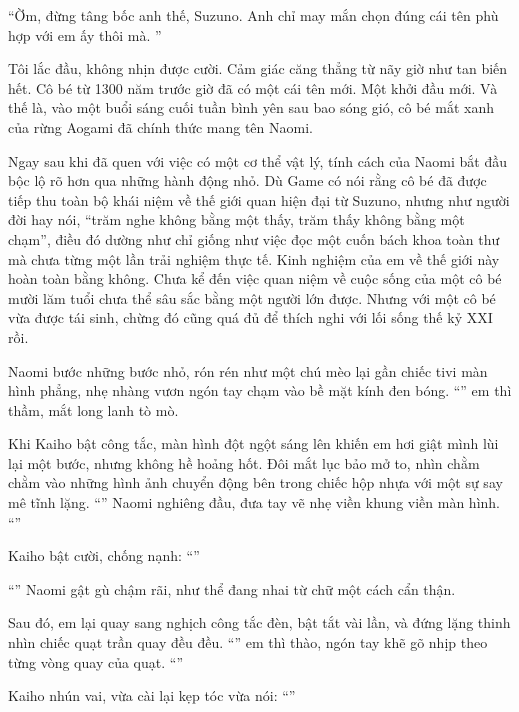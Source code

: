 \documentclass[../main.tex]{subfiles}
\begin{document}
``Ờm, đừng tâng bốc anh thế, Suzuno. Anh chỉ may mắn chọn đúng cái tên phù hợp với em ấy thôi mà. ''

Tôi lắc đầu, không nhịn được cười. Cảm giác căng thẳng từ nãy giờ như tan biến hết. Cô bé từ 1300 năm trước giờ đã có một cái tên mới. Một khởi đầu mới. Và thế là, vào một buổi sáng cuối tuần bình yên sau bao sóng gió, cô bé mắt xanh của rừng Aogami đã chính thức mang tên Naomi.

\ct

Ngay sau khi đã quen với việc có một cơ thể vật lý, tính cách của Naomi bắt đầu bộc lộ rõ hơn qua những hành động nhỏ. Dù Game có nói rằng cô bé đã được tiếp thu toàn bộ khái niệm về thế giới quan hiện đại từ Suzuno, nhưng như người đời hay nói, ``trăm nghe không bằng một thấy, trăm thấy không bằng một chạm'', điều đó dường như chỉ giống như việc đọc một cuốn bách khoa toàn thư mà chưa từng một lần trải nghiệm thực tế. Kinh nghiệm của em về thế giới này hoàn toàn bằng không. Chưa kể đến việc quan niệm về cuộc sống của một cô bé mười lăm tuổi chưa thể sâu sắc bằng một người lớn được. Nhưng với một cô bé vừa được tái sinh, chừng đó cũng quá đủ để thích nghi với lối sống thế kỷ XXI rồi.

Naomi bước những bước nhỏ, rón rén như một chú mèo lại gần chiếc tivi màn hình phẳng, nhẹ nhàng vươn ngón tay chạm vào bề mặt kính đen bóng. ``'' em thì thầm, mắt long lanh tò mò.

Khi Kaiho bật công tắc, màn hình đột ngột sáng lên khiến em hơi giật mình lùi lại một bước, nhưng không hề hoảng hốt. Đôi mắt lục bảo mở to, nhìn chằm chằm vào những hình ảnh chuyển động bên trong chiếc hộp nhựa với một sự say mê tĩnh lặng. ``'' Naomi nghiêng đầu, đưa tay vẽ nhẹ viền khung viền màn hình. ``''

Kaiho bật cười, chống nạnh: ``''

``'' Naomi gật gù chậm rãi, như thể đang nhai từ chữ một cách cẩn thận.

Sau đó, em lại quay sang nghịch công tắc đèn, bật tắt vài lần, và đứng lặng thinh nhìn chiếc quạt trần quay đều đều. ``'' em thì thào, ngón tay khẽ gõ nhịp theo từng vòng quay của quạt. ``''

Kaiho nhún vai, vừa cài lại kẹp tóc vừa nói: ``''
\end{document}
